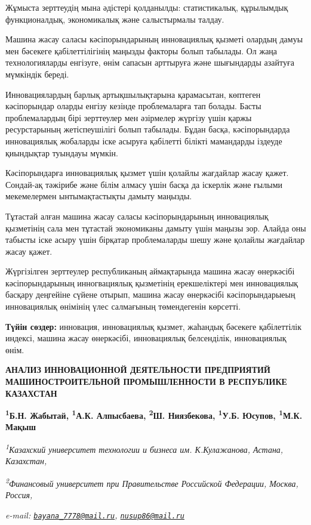 Жұмыста зерттеудің мына әдістері қолданылды: статистикалық, құрылымдық
функционалдық, экономикалық және салыстырмалы талдау.

Машина жасау саласы кәсіпорындарының инновациялық қызметі олардың дамуы
мен бәсекеге қабілеттілігінің маңызды факторы болып табылады. Ол жаңа
технологияларды енгізуге, өнім сапасын арттыруға және шығындарды
азайтуға мүмкіндік береді.

Инновациялардың барлық артықшылықтарына қарамасытан, көптеген
кәсіпорындар оларды енгізу кезінде проблемаларға тап болады. Басты
проблемалардың бірі зерттеулер мен әзірмелер жүргізу үшін қаржы
ресурстарының жетіспеушілігі болып табылады. Бұдан басқа, кәсіпорындарда
инновациялық жобаларды іске асыруға қабілетті білікті мамандарды іздеуде
қиындықтар туындауы мүмкін.

Кәсіпорындарға инновациялық қызмет үшін қолайлы жағдайлар жасау қажет.
Сондай-ақ тәжірибе және білім алмасу үшін басқа да іскерлік және ғылыми
мекемелермен ынтымақтастықты дамыту маңызды.

Тұтастай алған машина жасау саласы кәсіпорындарының инновациялық
қызметінің сала мен тұтастай экономиканы дамыту үшін маңызы зор. Алайда
оны табысты іске асыру үшін бірқатар проблемаларды шешу және қолайлы
жағдайлар жасау қажет.

Жүргізілген зерттеулер республиканың аймақтарында машина жасау
өнеркәсібі кәсіпорындарының инногвациялық қызметінің ерекшеліктері мен
инновациялық басқару деңгейіне сүйене отырып, машина жасау өнеркәсібі
кәсіпорындарыеың инновациялық өнімінің үлес салмағының төмендегенін
көрсетті.

{\bfseries Түйін сөздер:} инновация, инновациялық қызмет, жаһандық бәсекеге
қабілеттілік индексі, машина жасау өнеркәсібі, инновациялық белсенділік,
инновациялық өнім.

\begin{articleheader}
{\bfseries АНАЛИЗ ИННОВАЦИОННОЙ ДЕЯТЕЛЬНОСТИ ПРЕДПРИЯТИЙ МАШИНОСТРОИТЕЛЬНОЙ ПРОМЫШЛЕННОСТИ В РЕСПУБЛИКЕ КАЗАХСТАН}

{\bfseries
\textsuperscript{1}Б.Н. Жабытай\textsuperscript{\envelope },
\textsuperscript{1}А.К. Алпысбаева,
\textsuperscript{2}Ш. Ниязбекова,
\textsuperscript{1}У.Б. Юсупов\textsuperscript{\envelope },
\textsuperscript{1}М.К. Мақыш}
\end{articleheader}

\begin{affiliation}
\emph{\textsuperscript{1}Казахский университет технологии и бизнеса им. К.Кулажанова, Астана, Казахстан,}

\emph{\textsuperscript{2}Финансовый университет при Правительстве Российской Федерации, Москва, Россия,}

\emph{e-mail: \href{mailto:bayana_7778@mail.ru}{\nolinkurl{bayana\_7778@mail.ru}}, \href{mailto:nusup86@mail.ru}{\nolinkurl{nusup86@mail.ru}}}
\end{affiliation}

